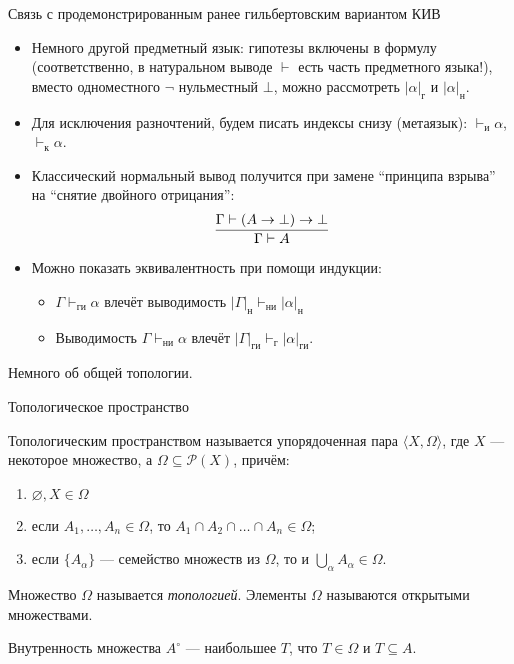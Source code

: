 \documentclass[aspectratio=169]{beamer}
\begin{document}
\begin{frame}{Связь с продемонстрированным ранее гильбертовским вариантом КИВ}
\begin{itemize}
\item Немного другой предметный язык: гипотезы включены в формулу (соответственно, в натуральном выводе $\vdash$ есть часть предметного языка!), 
вместо одноместного $\neg$ нульместный $\bot$, можно рассмотреть $|\alpha|_\text{г}$ и $|\alpha|_\text{н}$.
\item Для исключения разночтений, будем писать индексы снизу (метаязык): $\vdash_\text{и}\alpha$, $\vdash_\text{к}\alpha$.
\item Классический нормальный вывод получится при замене ``принципа взрыва'' на ``снятие двойного отрицания'': $$\infer{\Gamma\vdash A}{\Gamma\vdash (A\rightarrow\bot)\rightarrow\bot}$$
\item Можно показать эквивалентность при помощи индукции:
\begin{itemize}
\item $\Gamma\vdash_\text{ги}\alpha$ влечёт выводимость $|\Gamma|_\text{н}\vdash_\text{ни}|\alpha|_\text{н}$
\item Выводимость $\Gamma\vdash_\text{ни}\alpha$ влечёт $|\Gamma|_\text{ги}\vdash_\text{г}|\alpha|_\text{ги}$.
\end{itemize}
\end{itemize}
\end{frame}

\begin{frame}{}
\begin{center}\Large Немного об общей топологии.\end{center}
\end{frame}


\begin{frame}{Топологическое пространство}
\begin{defrus}Топологическим пространством называется упорядоченная пара $\langle X, \Omega \rangle$,
где $X$ --- некоторое множество, а $\Omega \subseteq \mathcal{P}(X)$, причём:
\begin{enumerate}
\item $\varnothing, X \in \Omega$
\item если $A_1, \dots, A_n \in \Omega$, то $A_1 \cap A_2 \cap \dots \cap A_n \in \Omega$;
\item если $\{A_\alpha\}$ --- семейство множеств из $\Omega$, то и $\bigcup_\alpha A_\alpha \in \Omega$.
\end{enumerate}

Множество $\Omega$ называется \emph{топологией}.
Элементы $\Omega$ называются открытыми множествами.
\end{defrus}

\begin{defrus}Внутренность множества $A^\circ$ --- наибольшее $T$, что $T \in \Omega$ и $T \subseteq A$.\end{defrus}
\end{frame}
\end{document}
